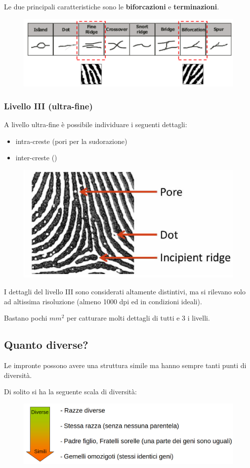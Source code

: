 Le due principali caratteristiche sono le \textbf{biforcazioni} e \textbf{terminazioni}.
\begin{figure}[ht]
    \centering
    \includegraphics[width=0.75\linewidth]{images-chap5/caratteristiche.png}
\end{figure}

\subsubsection{Livello III (ultra-fine)}
A livello ultra-fine è possibile individuare i seguenti dettagli:
\begin{itemize}
    \item intra-creste (pori per la sudorazione)
    \item inter-creste ()
\end{itemize}

\begin{figure}[ht]
    \centering
    \includegraphics[width=0.5\linewidth]{images-chap5/livello3.png}
\end{figure}

I dettagli del livello III sono
considerati altamente distintivi,
ma si rilevano solo ad altissima
risoluzione (almeno 1000 dpi
ed in condizioni ideali).

Bastano pochi $mm^2$ per catturare molti dettagli di tutti e 3 i livelli.

\subsection{Quanto diverse?}

Le impronte possono avere una struttura simile ma hanno sempre tanti
punti di diversità.

Di solito si ha la seguente scala di diversità:
\begin{figure}[ht]
    \centering
    \includegraphics[width=1\linewidth]{images-chap5/diversita.png}
\end{figure}

